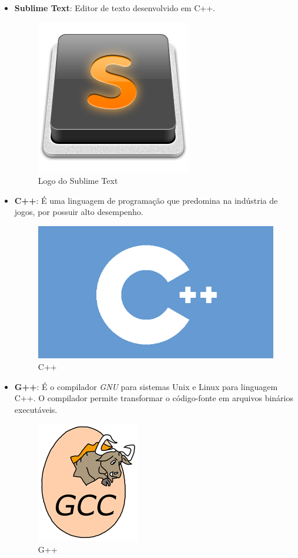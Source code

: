 \documentclass[11pt]{article} %
\begin{document}
\begin{itemize}
\item \textbf{Sublime Text}: Editor de texto desenvolvido em C++.

\begin{figure}[!htp]
\centering
\includegraphics[scale=0.3]{res/Sublime_Text_Logo.png}
\caption{Logo do Sublime Text}
\label{Sublime text}
\end{figure}

\newpage

\item \textbf{C++}: É uma linguagem de programação que predomina na indústria de jogos, por possuir alto desempenho.

\begin{figure}[!htp]
\centering
\includegraphics[scale=0.2]{res/cpp.png}
\caption{C++}
\label{C++}
\end{figure}

\item \textbf{G++}: É o compilador \textit{GNU} para sistemas Unix e Linux para linguagem C++. O compilador permite transformar o código-fonte em arquivos binários executáveis.

\begin{figure}[!htp]
\centering
\includegraphics[scale=0.4]{res/GCC.png}
\caption{G++}
\label{Logo do G++}
\end{figure}


\end{itemize}
\end{document}
